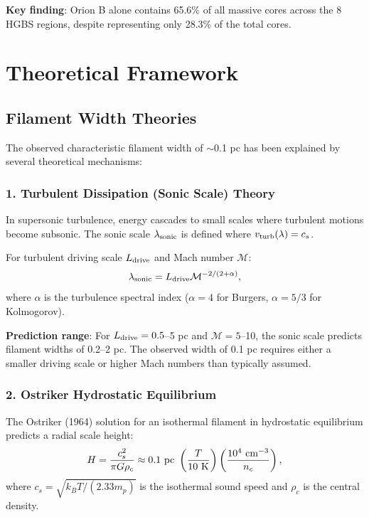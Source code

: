 \documentclass[11pt,a4paper]{article}
\begin{document}
\noindent\textbf{Key finding}: Orion B alone contains 65.6\% of all massive cores across the 8 HGBS regions, despite representing only 28.3\% of the total cores.

\section{Theoretical Framework}

\subsection{Filament Width Theories}

The observed characteristic filament width of $\sim$0.1 pc has been explained by several theoretical mechanisms:

\subsubsection{1. Turbulent Dissipation (Sonic Scale) Theory}

In supersonic turbulence, energy cascades to small scales where turbulent motions become subsonic. The sonic scale $\lambda_{\rm sonic}$ is defined where $v_{\rm turb}(\lambda) = c_s$.

For turbulent driving scale $L_{\rm drive}$ and Mach number $\mathcal{M}$:
\begin{equation}
\lambda_{\rm sonic} = L_{\rm drive} \mathcal{M}^{-2/(2+\alpha)},
\end{equation}
where $\alpha$ is the turbulence spectral index ($\alpha = 4$ for Burgers, $\alpha = 5/3$ for Kolmogorov).

\textbf{Prediction range}: For $L_{\rm drive} = 0.5$--5 pc and $\mathcal{M} = 5$--10, the sonic scale predicts filament widths of 0.2--2 pc. The observed width of 0.1 pc requires either a smaller driving scale or higher Mach numbers than typically assumed.

\subsubsection{2. Ostriker Hydrostatic Equilibrium}

The Ostriker (1964) solution for an isothermal filament in hydrostatic equilibrium predicts a radial scale height:
\begin{equation}
H = \frac{c_s^2}{\pi G \rho_c} \approx 0.1~{\rm pc}~\left(\frac{T}{10~{\rm K}}\right)\left(\frac{10^4~{\rm cm}^{-3}}{n_c}\right),
\end{equation}
where $c_s = \sqrt{k_B T / (2.33 m_p)}$ is the isothermal sound speed and $\rho_c$ is the central density.
\end{document}
